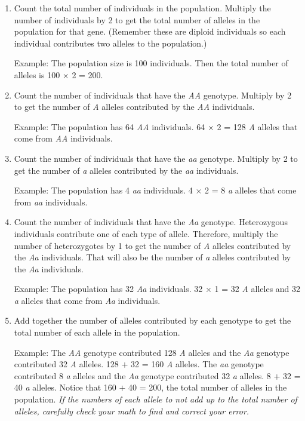 \documentclass[12pt]{exam}
\newcommand{\allele}[1]{\textit{#1}}
\begin{document}
\begin{enumerate}
	\item Count the total number of individuals in the population. Multiply the number of individuals by 2 to get the total number of alleles in the population for that gene. (Remember these are diploid individuals so each individual contributes two alleles to the population.) 
	
	Example: The population size is 100 individuals. Then the total number of alleles is 100 $\times$ 2 = 200.
	
	\item Count the number of individuals that have the \allele{AA} genotype. Multiply by 2 to get the number of \allele{A} alleles contributed by the \allele{AA} individuals.
	
	Example: The population has 64 \allele{AA} individuals. 64 $\times$ 2 = 128 \allele{A} alleles that come from \allele{AA} individuals.
	
	\item Count the number of individuals that have the \allele{aa} genotype. Multiply by 2 to get the number of \allele{a} alleles contributed by the \allele{aa} individuals.
	
	Example: The population has 4 \allele{aa} individuals. 4 $\times$ 2 = 8 \allele{a} alleles that come from \allele{aa} individuals.
	
	\item Count the number of individuals that have the \allele{Aa} genotype. Heterozygous individuals contribute one of each type of allele. Therefore, multiply the number of heterozygotes by 1 to get the number of \allele{A} alleles contributed by the \allele{Aa} individuals. That will also be the number of \allele{a} alleles contributed by the \allele{Aa} individuals.
	
	Example: The population has 32 \allele{Aa} individuals. 32 $\times$ 1 = 32 \allele{A} alleles and 32 \allele{a} alleles that come from \allele{Aa} individuals.
	
	\item Add together the number of alleles contributed by each genotype to get the total number of each allele in the population. 
	
	Example: The \allele{AA} genotype contributed 128 \allele{A} alleles and the \textit{Aa} genotype contributed 32 \textit{A} alleles. 128 $+$ 32 = 160 \allele{A} alleles.  The \allele{aa} genotype contributed 8 \allele{a} alleles and the \allele{Aa} genotype contributed 32 \allele{a} alleles. 8 $+$ 32 = 40 \allele{a} alleles. Notice that 160 $+$ 40 = 200, the total number of alleles in the population. \emph{If the numbers of each allele to not add up to the total number of alleles, carefully check your math to find and correct your error.}
	

\end{enumerate}
\end{document}
